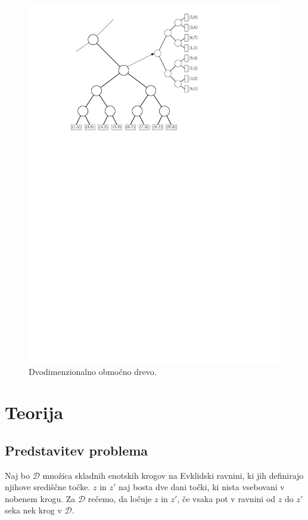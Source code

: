 \documentclass[a4paper, 12pt]{book}
\newcommand{\D}{\ensuremath{\mathcal{D}}}
\begin{document}
\begin{figure}
\centerline{\includegraphics[scale=1.2]{pics/rangeTree2.pdf}}
\caption{Dvodimenzionalno območno drevo.}
\label{range-primer}
\end{figure}


\chapter{Teorija}
\section{Predstavitev problema}
Naj bo $\D$ množica skladnih enotskih krogov na Evklidski ravnini, ki jih definirajo njihove središčne točke.  $z$ in $z'$ naj bosta dve dani točki, ki nista vsebovani v nobenem krogu. Za $\D$ rečemo, da ločuje $z$ in $z'$, če vsaka pot v ravnini od $z$ do $z'$ seka nek krog v $\D$.
\end{document}
